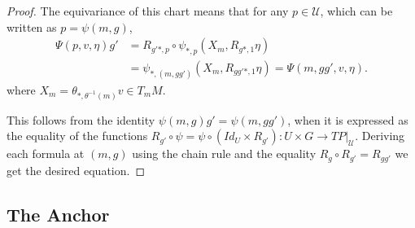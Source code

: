 \begin{proof}
The equivariance of this chart%
 means that for any $p \in \mathcal U$, which can be written as $p = \psi(m, g)$,
\begin{align*}
    \Psi(p, v, \eta) g' &=R_{g'*, p} \circ \psi_{*, p}(X_m, R_{g*, 1} \eta)\\
    &= \psi_{*, (m, gg')}(X_m, R_{gg'*, 1} \eta) = \Psi(m, gg', v, \eta).
\end{align*} where $X_m = \theta_{*, \theta^{-1}(m)} v \in T_m M$.

This follows from the identity $\psi(m, g) g' = \psi(m, gg')$, when it is expressed as the equality of the functions $R_{g'} \circ \psi = \psi \circ (Id_U \times R_{g'}) : U \times G \to TP|_{\mathcal U}$. Deriving each formula at $(m, g)$ using the chain rule and the equality $R_g \circ R_{g'} = R_{gg'}$ we get the desired equation.%


\end{proof}

\subsection{The Anchor}

